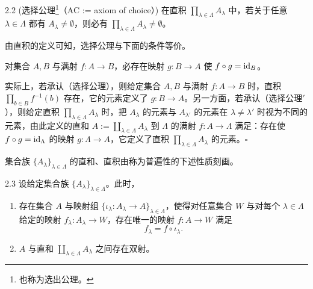 \begin{definition}[公理]{2.2} (选择公理\footnote{也称为选出公理。}（AC := axiom of choice）) 在直积 $\prod_{\lambda\in\Lambda}A_\lambda$ 中，若关于任意 $\lambda\in\Lambda$ 都有 $A_\lambda\neq\emptyset$，则必有 $\prod_{\lambda\in\Lambda}A_\lambda\neq\emptyset$。\end{definition}


由直积的定义可知，选择公理与下面的条件等价。

 对集合 $A,B$ 与满射 $f\colon A\to B$，必存在映射 $g\colon B\to A$ 使 $f\circ g=\mathrm{id}_B$。

实际上，若承认（选择公理），则给定集合 $A,B$ 与满射 $f\colon A\to B$ 时，直积 $\prod_{b\in B}f^{-1}(b)$ 存在，它的元素定义了 $g\colon B\to A$。另一方面，若承认（选择公理$'$），则给定直积 $\prod_{\lambda\in\Lambda}A_\lambda$ 时，把 $A_\lambda$ 的元素与 $A_{\lambda'}$ 的元素在 $\lambda\neq\lambda'$ 时视为不同的元素，由此定义的直和 $A:=\coprod_{\lambda\in\Lambda}A_\lambda$ 到 $\Lambda$ 的满射 $f\colon A\to\Lambda$ 满足：存在使 $f\circ g=\mathrm{id}_\Lambda$ 的映射 $g\colon\Lambda\to A$，它定义了直积 $\prod_{\lambda\in\Lambda}A_\lambda$ 的元素。\hfill$\square$

集合族 $\{A_\lambda\}_{\lambda\in\Lambda}$ 的直和、直积由称为普遍性的下述性质刻画。

\begin{lemma}{2.3} 设给定集合族 $\{A_\lambda\}_{\lambda\in\Lambda}$。此时，
\begin{enumerate}[label=s\arabic*), leftmargin=*]
  \item 存在集合 $A$ 与映射组 $\{\iota_\lambda\colon A_\lambda\to A\}_{\lambda\in\Lambda}$，使得对任意集合 $W$ 与对每个 $\lambda\in\Lambda$ 给定的映射 $f_\lambda\colon A_\lambda\to W$，存在唯一的映射 $f\colon A\to W$ 满足
  \[
    f_\lambda = f\circ\iota_\lambda .
  \]
  \item $A$ 与直和 $\coprod_{\lambda\in\Lambda}A_\lambda$ 之间存在双射。
\end{enumerate}
\end{lemma}

